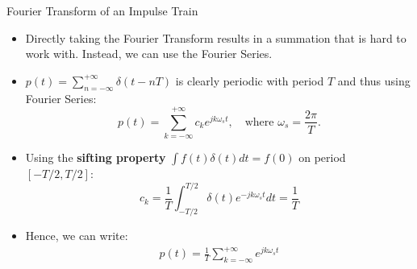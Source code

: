 \begin{frame}{Fourier Transform of an Impulse Train}
  \vspace{-0.2cm}
  \begin{itemize}
      [bullet]
    \item Directly taking the Fourier Transform results in a summation that is hard to work with. Instead, we can use the Fourier Series.
    \item $p(t) = \sum_{n=-\infty}^{+\infty} \delta(t-nT)$ is clearly periodic with period $T$ and thus using Fourier Series:
      \begin{equation*}
        p(t) = \sum_{k=-\infty}^{+\infty} c_k e^{jk\omega_s t}, \quad \text{where } \omega_s = \frac{2\pi}{T}.
      \end{equation*}
    \item Using the \textbf{sifting property} $\int f(t)\delta(t)dt = f(0)$ on period $[-T/2, T/2]$:
      \begin{equation*}
        c_k = \frac{1}{T} \int_{-T/2}^{T/2} \delta(t) e^{-jk\omega_s t} dt = \frac{1}{T}
      \end{equation*}
    \item Hence, we can write:
      \begin{align*}
        p(t) = \frac{1}{T} \sum_{k=-\infty}^{+\infty} e^{jk\omega_s t}
      \end{align*}
  \end{itemize}
\end{frame}

